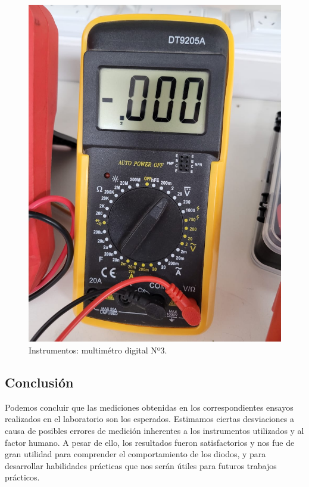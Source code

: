 \documentclass[chaptersright]{informeutn}
\begin{document}
\begin{figure}[H]
\begin{minipage}{0.3\textwidth}
            \includegraphics[width=\textwidth]{pictures/multimetro-angelo.jpeg}
            \caption{Instrumentos: multimétro digital Nº3.}
        \end{minipage}
    \end{figure}

    \subsection{Conclusión}
        Podemos concluir que las mediciones obtenidas en los correspondientes ensayos realizados en el laboratorio son los esperados. Estimamos ciertas desviaciones a causa de posibles errores de medición inherentes a los instrumentos utilizados y al factor humano. A pesar de ello, los resultados fueron satisfactorios y nos fue de gran utilidad para comprender el comportamiento de los diodos, y para desarrollar habilidades prácticas que nos serán útiles para futuros trabajos prácticos. 
    
\end{document}
